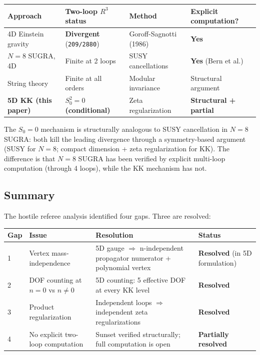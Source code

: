 \documentclass[aps,prd,preprint,superscriptaddress,longbibliography,floatfix]{revtex4-2}
\theoremstyle{remark}
\begin{document}
\begin{table}[H]
\begin{ruledtabular}
\begin{tabular}{p{3.8cm}p{3.8cm}p{3.8cm}p{3.8cm}}
Approach & Two-loop $R^{3}$ status & Method & Explicit computation? \\
\hline
4D Einstein gravity & \textbf{Divergent} (\texttt{209/2880}) & Goroff-Sagnotti (1986) & \textbf{Yes} \\
$N=8$ SUGRA, 4D & Finite at 2 loops & SUSY cancellations & \textbf{Yes} (Bern et al.) \\
String theory & Finite at all orders & Modular invariance & Structural argument \\
\textbf{5D KK (this paper)} & \textbf{$S_{0}^{2} = 0$ (conditional)} & Zeta regularization & \textbf{Structural + partial} \\
\end{tabular}
\end{ruledtabular}
\end{table}

The $S_{0} = 0$ mechanism is structurally analogous to SUSY cancellation in $N=8$ SUGRA: both kill the leading divergence through a symmetry-based argument (SUSY for $N=8$; compact dimension + zeta regularization for KK). The difference is that $N=8$ SUGRA has been verified by explicit multi-loop computation (through 4 loops), while the KK mechanism has not.



\subsection{Summary}

The hostile referee analysis identified four gaps. Three are resolved:


\begin{table}[H]
\begin{ruledtabular}
\begin{tabular}{p{3.8cm}p{3.8cm}p{3.8cm}p{3.8cm}}
Gap & Issue & Resolution & Status \\
\hline
1 & Vertex mass-independence & 5D gauge $\Longrightarrow$ n-independent propagator numerator + polynomial vertex & \textbf{Resolved} (in 5D formulation) \\
2 & DOF counting at $n = 0$ vs $n \neq 0$ & 5D counting: 5 effective DOF at every KK level & \textbf{Resolved} \\
3 & Product regularization & Independent loops $\Longrightarrow$ independent zeta regularizations & \textbf{Resolved} \\
4 & No explicit two-loop computation & Sunset verified structurally; full computation is open & \textbf{Partially resolved} \\
\end{tabular}
\end{ruledtabular}
\end{table}
\end{document}
